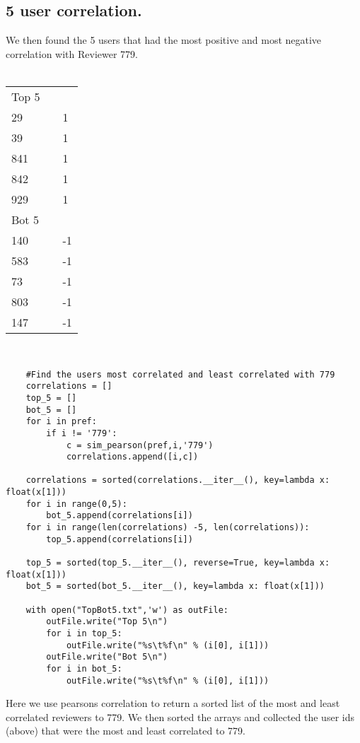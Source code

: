 \documentclass[11pt]{article}
\begin{document}
	\subsection{5 user correlation.}
	\hspace{10mm} We then found the 5 users that had the most positive and most negative correlation with Reviewer 779. \\ \\
	\begin{table}[h!]
		\begin{tabular}{lll}
			Top 5 &  &    \\
			29    &  & 1  \\
			39    &  & 1  \\
			841   &  & 1  \\
			842   &  & 1  \\
			929   &  & 1  \\
			Bot 5 &  &    \\
			140   &  & -1 \\
			583   &  & -1 \\
			73    &  & -1 \\
			803   &  & -1 \\
			147   &  & -1
		\end{tabular}
	\end{table} \\
	\begin{lstlisting}
	#Find the users most correlated and least correlated with 779
	correlations = []
	top_5 = []
	bot_5 = []
	for i in pref:
	    if i != '779':
	        c = sim_pearson(pref,i,'779')
	        correlations.append([i,c])
	
	correlations = sorted(correlations.__iter__(), key=lambda x: float(x[1]))
	for i in range(0,5):
	    bot_5.append(correlations[i])
	for i in range(len(correlations) -5, len(correlations)):
	    top_5.append(correlations[i])
	
	top_5 = sorted(top_5.__iter__(), reverse=True, key=lambda x: float(x[1]))
	bot_5 = sorted(bot_5.__iter__(), key=lambda x: float(x[1]))
	
	with open("TopBot5.txt",'w') as outFile:
	    outFile.write("Top 5\n")
	    for i in top_5:
	        outFile.write("%s\t%f\n" % (i[0], i[1]))
	    outFile.write("Bot 5\n")
	    for i in bot_5:
	        outFile.write("%s\t%f\n" % (i[0], i[1]))
	\end{lstlisting}
	\hspace{10mm} Here we use pearsons correlation to return a sorted list of the most and least correlated reviewers to 779.  We then sorted the arrays and collected the user ids (above) that were the most and least correlated to 779. \\
\end{document}
